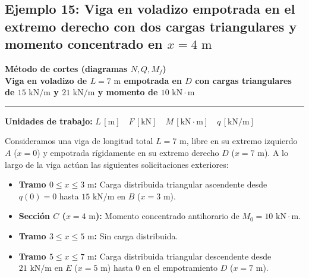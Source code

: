\subsection{Ejemplo 15: Viga en voladizo empotrada en el extremo derecho con dos cargas triangulares y momento concentrado en \texorpdfstring{$x = 4\text{ m}$}{x = 4 m}}

\begin{tcolorbox}[colback=blue!3!white, colframe=blue!40!black, arc=3pt, boxrule=0.8pt, left=8pt, right=8pt, top=6pt, bottom=6pt]
    \centering
    {\Large\bfseries\color{blue!60!black} Método de cortes (diagramas $N, Q, M_f$)}\\[2pt]
    {\normalsize\bfseries Viga en voladizo de $L = 7\text{ m}$ empotrada en $D$ con cargas triangulares de $15\text{ kN/m}$ y $21\text{ kN/m}$ y momento de $10\text{ kN}\cdot\text{m}$}

    \vspace{4pt}\hrule\vspace{4pt}
    {\small\textbf{Unidades de trabajo:} $L\,[\text{m}] \quad F\,[\text{kN}] \quad M\,[\text{kN}\cdot\text{m}] \quad q\,[\text{kN/m}]$}
\end{tcolorbox}


Consideramos una viga de longitud total $L = 7\text{ m}$, libre en su extremo izquierdo $A$ ($x = 0$) y empotrada rígidamente en su extremo derecho $D$ ($x = 7\text{ m}$). A lo largo de la viga actúan las siguientes solicitaciones exteriores:
\begin{itemize}
    \item \textbf{Tramo $0 \le x \le 3\text{ m}$:} Carga distribuida triangular ascendente desde $q(0) = 0$ hasta $15\text{ kN/m}$ en $B$ ($x = 3\text{ m}$).
    \item \textbf{Sección $C$ ($x = 4\text{ m}$):} Momento concentrado antihorario de $M_0 = 10\text{ kN}\cdot\text{m}$.
    \item \textbf{Tramo $3 \le x \le 5\text{ m}$:} Sin carga distribuida.
    \item \textbf{Tramo $5 \le x \le 7\text{ m}$:} Carga distribuida triangular descendente desde $21\text{ kN/m}$ en $E$ ($x = 5\text{ m}$) hasta $0$ en el empotramiento $D$ ($x = 7\text{ m}$).
\end{itemize}

